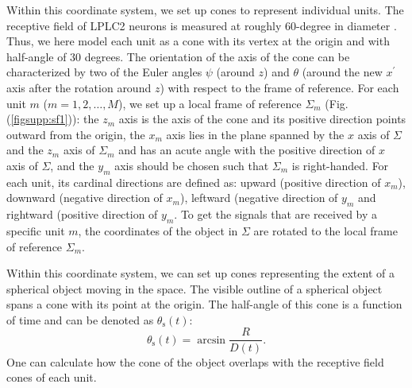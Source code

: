 \documentclass[pdftex,9pt,lineno]{elife}
\begin{document}
Within this coordinate system, we set up cones to represent individual units. The receptive field of LPLC2 neurons is measured at roughly 60-degree in diameter \citep{klapoetke2017ultra}. Thus, we here model each unit as a cone with its vertex at the origin and with half-angle of 30 degrees. The orientation of the axis of the cone can be characterized by two of the Euler angles $\psi$ (around $z$) and $\theta$ (around the new $x^{'}$ axis after the rotation around $z$) with respect to the frame of reference. For each unit $m$ ($m=1, 2, \dots, M$), we set up a local frame of reference $\Sigma_{m}$ (Fig. (\ref{figsupp:sf1})): the $z_{m}$ axis is the axis of the cone and its positive direction points outward from the origin, the $x_{m}$ axis lies in the plane spanned by the $x$ axis of $\Sigma$ and the $z_{m}$ axis of $\Sigma_{m}$ and has an acute angle with the positive direction of $x$ axis of $\Sigma$, and the $y_{m}$ axis should be chosen such that $\Sigma_{m}$ is right-handed. For each unit, its cardinal directions are defined as: upward (positive direction of $x_{m}$), downward (negative direction of $x_{m}$), leftward (negative direction of $y_{m}$ and rightward (positive direction of $y_{m}$. To get the signals that are received by a specific unit $m$, the coordinates of the object in $\Sigma$ are rotated to the local frame of reference $\Sigma_{m}$.

Within this coordinate system, we can set up cones representing the extent of a spherical object moving in the space. The visible outline of a spherical object spans a cone with its point at the origin. The half-angle of this cone is a function of time and can be denoted as $\theta_{\text{s}}(t)$:
\begin{equation}
\theta_{\text{s}}(t) = \arcsin{\frac{R}{D(t)}}.
\end{equation}
One can calculate how the cone of the object overlaps with the receptive field cones of each unit.
\end{document}
